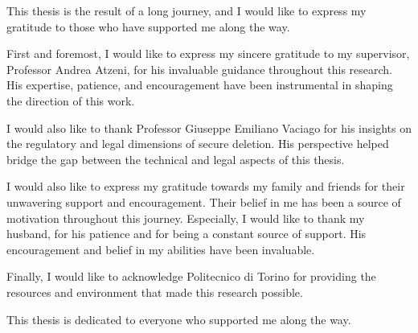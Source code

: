 
This thesis is the result of a long journey, and I would like to express my gratitude to those who have supported me along the way.

First and foremost, I would like to express my sincere gratitude to my supervisor, Professor Andrea Atzeni, for his invaluable guidance 
throughout this research. His expertise, patience, and encouragement have been instrumental in shaping the direction of this work. 

I would also like to thank Professor Giuseppe Emiliano Vaciago for his insights on the regulatory and legal dimensions of secure deletion. 
His perspective helped bridge the gap between the technical and legal aspects of this thesis. 

I would also like to express my gratitude towards my family and friends for their unwavering support and encouragement. Their belief in me 
has been a source of motivation throughout this journey. Especially, I would like to thank my husband, for his patience and for being a 
constant source of support. His encouragement and belief in my abilities have been invaluable.

Finally, I would like to acknowledge Politecnico di Torino for providing the resources and environment that made this research possible.

This thesis is dedicated to everyone who supported me along the way.






\vspace*{5\baselineskip}